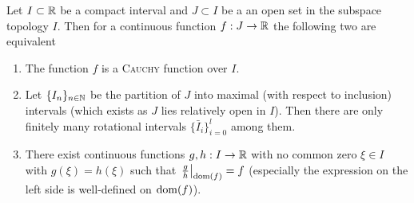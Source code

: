 \message{ !name(On The Routh-Hurwitz Theorem.tex)}\documentclass[10pt,a4paper]{article}
\begin{document}
\begin{lemma}
Let $I\subset\mathbb{R}$ be a compact interval and $J\subset I$ be a an open set in the subspace topology $I$. Then for a continuous function $f:J\rightarrow\mathbb{R}$ the following two are equivalent
\begin{enumerate}
\item The function $f$ is a \textsc{Cauchy} function over $I$.
\item Let $\{I_n\}_{n\in\mathbb{N}}$ be the partition of $J$ into maximal (with respect to inclusion) intervals (which exists as $J$ lies relatively open in $I$). Then there are only finitely many rotational intervals $\{\bar{I}_i\}_{i=0}^l$ among them.
\item There exist continuous functions $g,h:I\rightarrow\mathbb{R}$ with no common zero $\xi\in I$ with $g(\xi)=h(\xi)$ such that $\left. \frac{g}{h}\right\vert_{\operatorname{dom}(f)}=f$ (especially the expression on the left side is well-defined on $\operatorname{dom}(f)$).
\end{enumerate}
\end{lemma}
\end{document}
